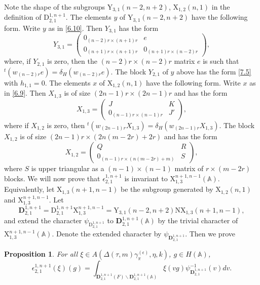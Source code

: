 \documentclass[12pts]{amsart}
\newcommand{\BA}{{\mathbb {A}}}
\newtheorem{prop}[thm]{Proposition}
\begin{document}
Note the shape of the subgroups
$\mathrm{Y}_{3,1}(n-2,n+2)$, $\mathrm{X}_{1,2}(n,1)$ in the
definition of $\mathrm{D}_{2,1}^{1,n+1}$. The elements $y$ of
$\mathrm{Y}_{3,1}(n-2,n+2)$ have the following form. Write $y$ as in
\eqref{6.10}. Then $Y_{3,1}$ has the form
$$
Y_{3,1}=\begin{pmatrix}0_{(n-2)r\times (n+1)r}&e\\0_{(n+1)r\times
	(n+1)r}&0_{(n+1)r\times (n-2)r}\end{pmatrix},
$$
where, if $Y_{2,1}$ is zero, then the $(n-2)r\times (n-2)r$ matrix
$e$ is such that $ {}^t(w_{(n-2)r}e)=\delta_H(w_{(n-2)r}e)$. The block
$Y_{2,1}$ of $y$ above has the form \eqref{7.5} with $h_{1,1}=0$.
The elements $x$ of $\mathrm{X}_{1,2}(n,1)$ have the following form.
Write $x$ as in \eqref{6.9}. Then $X_{1,3}$ is of size
$(2n-1)r\times (2n-1)r$ and has the form
\begin{equation}\label{8.16}
X_{1,3}=\begin{pmatrix}J&K\\0_{(n-1)r\times (n-1)r}&J'\end{pmatrix},
\end{equation}
where if $X_{1,2}$ is zero, then
${}^t(w_{(2n-1)r}X_{1,3})=\delta_H(w_{(2n-1)r}X_{1,3})$. The block $X_{1,2}$ is of
size $(2n-1)r\times (2n(m-2r)+2r)$ and has the form
\begin{equation}\label{8.17}
X_{1,2}=\begin{pmatrix}Q&R\\0_{(n-1)r\times
	(n(m-2r)+m)}&S\end{pmatrix},
\end{equation}
where $S$ is upper triangular as a $(n-1)\times (n-1)$ matrix of
$r\times (m-2r)$ blocks. We will now prove that $\epsilon_{2,1}^{1,n+1}$
is invariant to $\mathrm{X}_{1,3}^{n+1,n-1}(\BA)$. Equivalently,
let $\mathrm{X}_{1,3}(n+1,n-1)$ be the subgroup generated by
$\mathrm{X}_{1,2}(n,1)$ and $\mathrm{X}_{1,3}^{n+1,n-1}$. Let
$$
\mathbf{D}_{2,1}^{1,n+1}=\mathrm{D}_{2,1}^{1,n+1}\mathrm{X}_{1,3}^{n+1,n-1}
=\mathrm{Y}_{3,1}(n-2,n+2)\mathrm{N}\mathrm{X}_{1,3}(n+1,n-1),
$$
and extend the character $\psi_{\mathrm{D}_{2,1}^{1,n+1}}$ to
$\mathbf{D}_{2,1}^{1,n+1}(\BA)$ by the trivial character of
$\mathrm{X}_{1,3}^{n+1,n-1}(\BA)$. Denote the extended character
by $\psi_{\mathbf{D}_{2,1}^{1,n+1}}$. Then we prove
\begin{prop}\label{prop 8.4}
	For all $\xi\in A(\Delta(\tau,m)\gamma_\pi^{(\epsilon)},\eta,k)$, $g\in H(\BA)$,
	\begin{equation}\label{8.16.1}
	\epsilon_{2,1}^{1,n+1}(\xi)(g)=\int_{\mathbf{D}_{2,1}^{1,n+1}(F)\backslash
		\mathbf{D}_{2,1}^{1,n+1}(\BA)}\xi(vg)\psi_{\mathbf{D}_{2,1}^{1,n+1}}^{-1}(v)dv.
	\end{equation}
	\end{prop}
\end{document}
